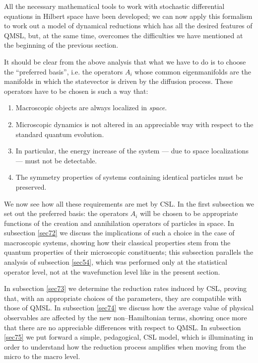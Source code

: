 \documentclass[10pt,a4paper]{article}
\begin{document}
All the necessary mathematical tools to work with stochastic
differential equations in Hilbert space have been developed; we
can now apply this formalism to work out a model of dynamical
reductions which has all the desired features of QMSL, but, at the
same time, overcomes the difficulties we have mentioned at the
beginning of the previous section.

It should be clear from the above analysis that what we have to do
is to choose the ``preferred basis'', i.e. the operators $A_{i}$
whose common eigenmanifolds are the manifolds in which the
statevector is driven by the diffusion process. These operators
have to be chosen is such a way that:
\begin{enumerate}
\item Macroscopic objects are always localized in {\it space}.
\item Microscopic dynamics is not altered in an appreciable way
with respect to the standard quantum evolution.
\item In particular, the energy increase of the system --- due to
space localizations --- must not be detectable.
\item The symmetry properties of systems containing identical
particles must be preserved.
\end{enumerate}
We now see how all these requirements are met by CSL. In the first
subsection we set out the preferred basis: the operators $A_{i}$
will be chosen to be appropriate functions of the creation and
annihilation operators of particles in space. In subsection
\ref{sec72} we discuss the implications of such a choice in the
case of macroscopic systems, showing how their classical
properties stem from the quantum properties of their microscopic
constituents; this subsection parallels the analysis of subsection
\ref{sec54}, which was performed only at the statistical operator
level, not at the wavefunction level like in the present section.

In subsection \ref{sec73} we determine the reduction rates induced
by CSL, proving that, with an appropriate choices of the
parameters, they are compatible with those of QMSL. In subsection
\ref{sec74} we discuss how the average value of physical
observables are affected by the new non--Hamiltonian terms,
showing once more that there are no appreciable differences with
respect to QMSL. In subsection \ref{sec75} we put forward a
simple, pedagogical, CSL model, which is illuminating in order to
understand how the reduction process amplifies when moving from
the micro to the macro level.
\end{document}
